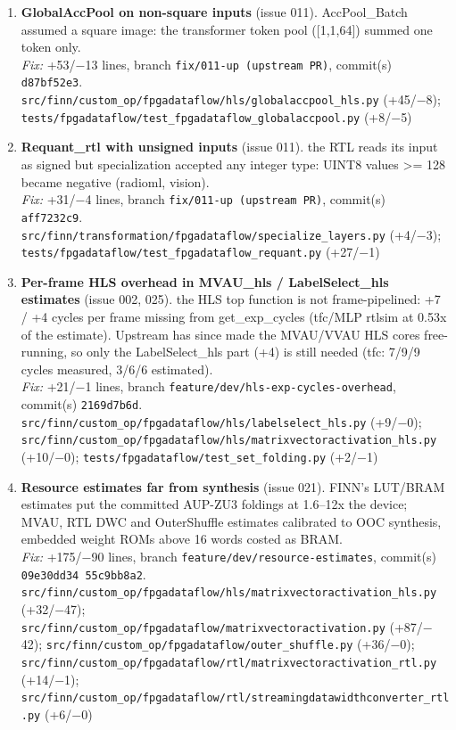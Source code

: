 \documentclass[a4paper,10pt]{article}
\begin{document}
\begin{enumerate}
\item \textbf{GlobalAccPool on non-square inputs} (issue 011). AccPool\_Batch assumed a square image: the transformer token pool ([1,1,64]) summed one token only.\\
\emph{Fix:} +53/$-$13 lines, branch \texttt{fix/011-up (upstream PR)}, commit(s) \texttt{d87bf52e3}.\\
{\footnotesize \texttt{src/finn/custom\_op/fpgadataflow/hls/globalaccpool\_hls.py} (+45/$-$8); \texttt{tests/fpgadataflow/test\_fpgadataflow\_globalaccpool.py} (+8/$-$5)}
\item \textbf{Requant\_rtl with unsigned inputs} (issue 011). the RTL reads its input as signed but specialization accepted any integer type: UINT8 values >= 128 became negative (radioml, vision).\\
\emph{Fix:} +31/$-$4 lines, branch \texttt{fix/011-up (upstream PR)}, commit(s) \texttt{aff7232c9}.\\
{\footnotesize \texttt{src/finn/transformation/fpgadataflow/specialize\_layers.py} (+4/$-$3); \texttt{tests/fpgadataflow/test\_fpgadataflow\_requant.py} (+27/$-$1)}
\item \textbf{Per-frame HLS overhead in MVAU\_hls / LabelSelect\_hls estimates} (issue 002, 025). the HLS top function is not frame-pipelined: +7 / +4 cycles per frame missing from get\_exp\_cycles (tfc/MLP rtlsim at 0.53x of the estimate). Upstream has since made the MVAU/VVAU HLS cores free-running, so only the LabelSelect\_hls part (+4) is still needed (tfc: 7/9/9 cycles measured, 3/6/6 estimated).\\
\emph{Fix:} +21/$-$1 lines, branch \texttt{feature/dev/hls-exp-cycles-overhead}, commit(s) \texttt{2169d7b6d}.\\
{\footnotesize \texttt{src/finn/custom\_op/fpgadataflow/hls/labelselect\_hls.py} (+9/$-$0); \texttt{src/finn/custom\_op/fpgadataflow/hls/matrixvectoractivation\_hls.py} (+10/$-$0); \texttt{tests/fpgadataflow/test\_set\_folding.py} (+2/$-$1)}
\item \textbf{Resource estimates far from synthesis} (issue 021). FINN's LUT/BRAM estimates put the committed AUP-ZU3 foldings at 1.6--12x the device; MVAU, RTL DWC and OuterShuffle estimates calibrated to OOC synthesis, embedded weight ROMs above 16 words costed as BRAM.\\
\emph{Fix:} +175/$-$90 lines, branch \texttt{feature/dev/resource-estimates}, commit(s) \texttt{09e30dd34 55c9bb8a2}.\\
{\footnotesize \texttt{src/finn/custom\_op/fpgadataflow/hls/matrixvectoractivation\_hls.py} (+32/$-$47); \texttt{src/finn/custom\_op/fpgadataflow/matrixvectoractivation.py} (+87/$-$42); \texttt{src/finn/custom\_op/fpgadataflow/outer\_shuffle.py} (+36/$-$0); \texttt{src/finn/custom\_op/fpgadataflow/rtl/matrixvectoractivation\_rtl.py} (+14/$-$1); \texttt{src/finn/custom\_op/fpgadataflow/rtl/streamingdatawidthconverter\_rtl.py} (+6/$-$0)}

\end{enumerate}
\end{document}
